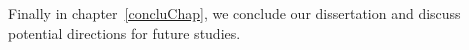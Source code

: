 \subsection{}
\vspace{-30.0pt}
Finally in chapter~\ref{concluChap}, we conclude our dissertation and discuss potential directions for
future studies. 

